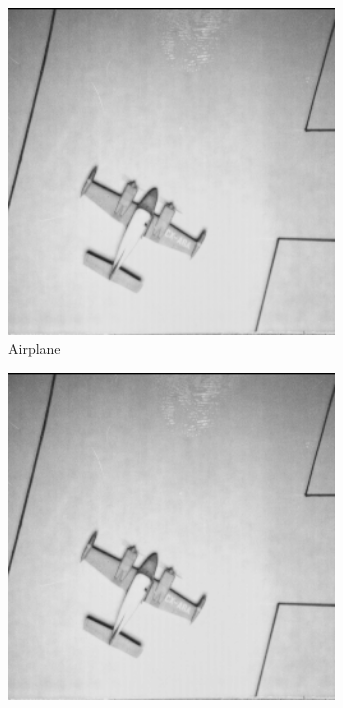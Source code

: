 \begin{figure}
\begin{subfigure}[b]{.23\textwidth}
  \centering
  \includegraphics[width=0.95\textwidth]{figures/test-images/original/airplane}
  \caption{Airplane}
  \label{fig:test-images-airplane}
\end{subfigure}
\begin{subfigure}[b]{.23\textwidth}
  \centering
  \includegraphics[width=0.95\textwidth]{figures/test-images/truncate1/airplane}

\end{subfigure}
\end{figure}
